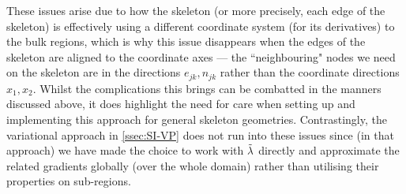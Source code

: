 These issues arise due to how the skeleton (or more precisely, each edge of the skeleton) is effectively using a different coordinate system (for its derivatives) to the bulk regions, which is why this issue disappears when the edges of the skeleton are aligned to the coordinate axes --- the ``neighbouring" nodes we need on the skeleton are in the directions $e_{jk}, n_{jk}$ rather than the coordinate directions $x_1, x_2$.
Whilst the complications this brings can be combatted in the manners discussed above, it does highlight the need for care when setting up and implementing this approach for general skeleton geometries.
Contrastingly, the variational approach in \ref{ssec:SI-VP} does not run into these issues since (in that approach) we have made the choice to work with $\tilde{\lambda}$ directly and approximate the related gradients globally (over the whole domain) rather than utilising their properties on sub-regions.

